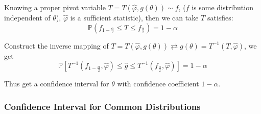     Knowing a proper pivot variable $T=T(\hat{\varphi},g(\theta))\sim f$, ($f$ is some distribution independent of $\theta$), $\hat{\varphi}$ is a sufficient statistic), then we can take $T$ satisfies:
    \begin{equation}
        \mathbb{P}(f_{1-\frac{\alpha}{2}}\leq T\leq f_{\frac{\alpha}{2}})=1-\alpha
    \end{equation}

    Construct the inverse mapping of $T=T(\hat{\varphi},g(\theta))\rightleftarrows g(\theta)=T^{-1}(T,\hat{\varphi})$, we get
    \begin{equation}
        \mathbb{P}[T^{-1}(f_{1-\frac{\alpha}{2}},\hat{\varphi})\leq\hat{g}\leq T^{-1}(f_{\frac{\alpha}{2}},\hat{\varphi})]=1-\alpha
    \end{equation}
    
    Thus get a confidence interval for $\theta$ with confidence coefficient $1-\alpha$.\\


\subsubsection{Confidence Interval for Common Distributions}\label{SubSectionConfidenceIntervalForDistributions}

